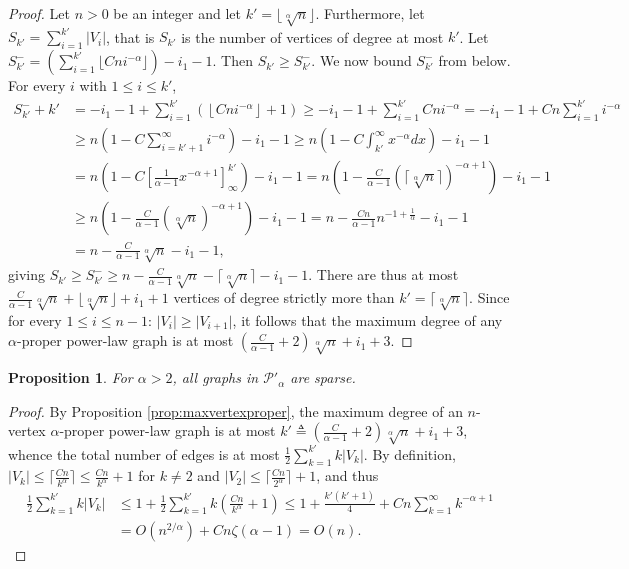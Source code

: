 \documentclass{article}
\newtheorem{proposition}{Proposition}
\theoremstyle{remark}
\newcommand{\PLC}{\ensuremath{ \mathcal{P}'_{\alpha}}}
\begin{document}
\begin{proof}
Let $n > 0$ be an integer and let $k' = \lfloor \sqrt[\alpha]{n} \rfloor$. 
Furthermore, let $S_{k'} = \sum_{i=1}^{k'} \vert V_i\vert$, that is $S_{k'}$ is the number of vertices of degree at most $k'$. Let $S^{-}_{k'} = (\sum_{i=1}^{k'} \lfloor Cni^{-\alpha}\rfloor) - i_1 - 1$. Then
$S_{k'} \geq S^{-}_{k'}$. We now bound $S^{-}_{k'}$ from below.
For every $i$ with $1 \leq i \leq k'$,
\begin{align*}
S^{-}_{k'} + k' & = -i_1 - 1 + \sum_{i=1}^{k'} \left(\left\lfloor Cn i^{-\alpha}\right\rfloor + 1\right) \geq  -i_1 - 1 + \sum_{i=1}^{k'} Cn i^{- \alpha}  = -i_1 - 1 + Cn \sum_{i=1}^{k'} i^{-\alpha} \\
& \geq n \left(1 - C\sum_{i=k'+1}^{\infty} i^{-\alpha} \right) - i_1 - 1 
 \geq n \left( 1 - C\int_{k'}^\infty x^{-\alpha} dx \right) - i_1 - 1\\
 & = n \left( 1 - C\left[ \frac{1}{\alpha - 1} x^{-\alpha + 1}\right]_{\infty}^{k'}\right) - i_1 - 1 = n \left( 1 - \frac{C}{\alpha - 1} \left( \lceil\sqrt[\alpha]{n} \rceil \right)^{-\alpha + 1}\right) - i_1 - 1\\
 & \geq n \left( 1 -  \frac{C}{\alpha - 1} \left(\sqrt[\alpha]{n}\right)^{-\alpha + 1} \right) - i_1 - 1 = n - \frac{Cn}{\alpha - 1}n^{-1+\frac{1}{\alpha}} - i_1 - 1\\
& = n - \frac{C}{\alpha - 1}\sqrt[\alpha]{n} - i_1 - 1,
\end{align*}
giving $S_{k'} \geq S^{-}_{k'} \geq n - \frac{C}{\alpha - 1}\sqrt[\alpha]{n} - \lceil \sqrt[\alpha]{n} \rceil - i_1 - 1$. There are thus at most $\frac{C}{\alpha - 1} \sqrt[\alpha]{n} + \lfloor \sqrt[\alpha]{n} \rfloor + i_1 + 1$ vertices of degree strictly more than $k' = \lceil \sqrt[\alpha]{n} \rceil$. Since for every $1 \leq i \leq n-1$: $\vert V_i \vert \geq \vert V_{i+1} \vert$, it follows that the maximum degree of any $\alpha$-proper power-law graph is at most $\left(\frac{C}{\alpha - 1} + 2\right) \sqrt[\alpha]{n} + i_1 + 3$.
\end{proof}

\begin{proposition}\label{prop:powerlawsparse}
For $\alpha > 2$, all graphs in $\PLC$ are sparse.
\end{proposition}
\begin{proof}
By Proposition \ref{prop:maxvertexproper}, the maximum degree of an $n$-vertex $\alpha$-proper power-law
graph is at most $k' \triangleq \left(\frac{C}{\alpha - 1} + 2\right) \sqrt[\alpha]{n} + i_1 + 3$, whence
the total number of edges is at most $\frac{1}{2}\sum_{k=1}^{k'} k \vert V_k\vert$. By definition,
$\vert V_k \vert\leq \lceil \frac{Cn}{k^\alpha}\rceil \leq \frac{Cn}{k^{\alpha}} + 1$ for $k\neq 2$ and $\vert V_2\vert\leq\lceil\frac{Cn}{2^{\alpha}}\rceil + 1$, and thus
\begin{align*}
\frac{1}{2}\sum_{k=1}^{k'} k\vert V_k\vert &\leq 1 + \frac{1}{2}\sum_{k=1}^{k'} k \left(\frac{Cn}{k^{\alpha}} + 1 \right)
 \leq 1 + \frac{k'(k'+1)}{4} + Cn\sum_{k=1}^{\infty} k^{-\alpha+1} \\
&   = O(n^{2/\alpha}) + Cn \zeta(\alpha - 1) = O(n).
\end{align*}
\end{proof}
\end{document}
